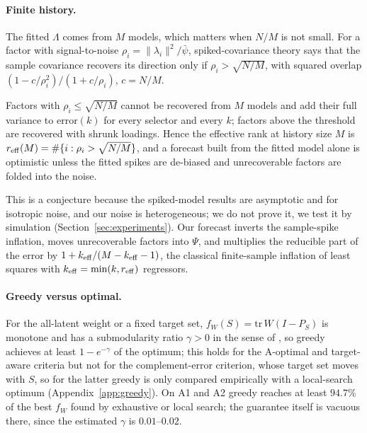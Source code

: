\paragraph{Finite history.}
The fitted $\Lambda$ comes from $M$ models, which matters when $N/M$ is not small.
For a factor with signal-to-noise $\rho_i=\|\lambda_i\|^2/\bar\psi$, spiked-covariance theory \citep{baik2005phase,baik2006eigenvalues,paul2007asymptotics} says that the sample covariance recovers its direction only if $\rho_i>\sqrt{N/M}$, with squared overlap $(1-c/\rho_i^2)/(1+c/\rho_i)$, $c=N/M$.
\begin{conjecture}\label{conj:fm}
Factors with $\rho_i\le\sqrt{N/M}$ cannot be recovered from $M$ models and add their full variance to $\mathrm{error}(k)$ for every selector and every $k$; factors above the threshold are recovered with shrunk loadings. Hence the effective rank at history size $M$ is $r_{\rm eff}(M)=\#\{i:\rho_i>\sqrt{N/M}\}$, and a forecast built from the fitted model alone is optimistic unless the fitted spikes are de-biased and unrecoverable factors are folded into the noise.
\end{conjecture}
This is a conjecture because the spiked-model results are asymptotic and for isotropic noise, and our noise is heterogeneous; we do not prove it, we test it by simulation (Section~\ref{sec:experiments}).
Our forecast inverts the sample-spike inflation, moves unrecoverable factors into $\Psi$, and multiplies the reducible part of the error by $1+k_{\rm eff}/(M-k_{\rm eff}-1)$, the classical finite-sample inflation of least squares with $k_{\rm eff}=\min(k,r_{\rm eff})$ regressors.

\paragraph{Greedy versus optimal.}
For the all-latent weight or a fixed target set, $f_W(S)=\mathrm{tr}\,W(I-P_S)$ is monotone and has a submodularity ratio $\gamma>0$ in the sense of \citet{das2011submodular}, so greedy achieves at least $1-e^{-\gamma}$ of the optimum; this holds for the A-optimal and target-aware criteria but not for the complement-error criterion, whose target set moves with $S$, so for the latter greedy is only compared empirically with a local-search optimum (Appendix~\ref{app:greedy}).
On A1 and A2 greedy reaches at least $94.7\%$ of the best $f_W$ found by exhaustive or local search; the guarantee itself is vacuous there, since the estimated $\gamma$ is $0.01$--$0.02$.
